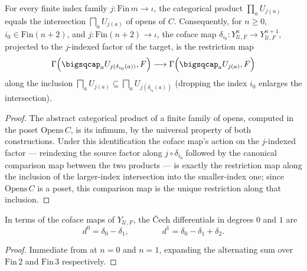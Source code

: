 \begin{lemma}
  \label{lem:adelic_cech_coface_restriction}
  \leanok
  For every finite index family \(j \colon \mathrm{Fin}\, m \to \iota\),
  the categorical product \(\prod_a U_{j(a)}\) equals the intersection
  \(\bigsqcap_a U_{j(a)}\) of opens of \(C\). Consequently, for
  \(n \ge 0\), \(i_0 \in \mathrm{Fin}(n+2)\), and
  \(j \colon \mathrm{Fin}(n+2) \to \iota\), the coface map \(\delta_{i_0}
  \colon Y_{\mathcal{U},F}^n \to Y_{\mathcal{U},F}^{n+1}\), projected to
  the \(j\)-indexed factor of the target, is the restriction map
  \[
    \Gamma\Bigl(\bigsqcap_a U_{j(\delta_{i_0}(a))}, F\Bigr)
      \longrightarrow
    \Gamma\Bigl(\bigsqcap_a U_{j(a)}, F\Bigr)
  \]
  along the inclusion
  \(\bigsqcap_a U_{j(a)} \subseteq \bigsqcap_a U_{j(\delta_{i_0}(a))}\)
  (dropping the index \(i_0\) enlarges the intersection).
\end{lemma}
\begin{proof}
  \leanok
  The abstract categorical product of a finite family of opens, computed
  in the poset \(\mathrm{Opens}\, C\), is its infimum, by the universal
  property of both constructions. Under this identification the coface
  map's action on the \(j\)-indexed factor --- reindexing the source
  factor along \(j \circ \delta_{i_0}\) followed by the canonical
  comparison map between the two products --- is exactly the restriction
  map along the inclusion of the larger-index intersection into the
  smaller-index one; since \(\mathrm{Opens}\, C\) is a poset, this
  comparison map is the unique restriction along that inclusion.
\end{proof}

\begin{lemma}
  \label{lem:adelic_cech_d01_d12_formula}
  \leanok
  In terms of the coface maps of \(Y_{\mathcal{U}, F}\), the Čech
  differentials in degrees \(0\) and \(1\) are
  \[
    d^0 = \delta_0 - \delta_1, \qquad\qquad
    d^1 = \delta_0 - \delta_1 + \delta_2.
  \]
\end{lemma}
\begin{proof}
  \leanok
  Immediate from  at
  \(n = 0\) and \(n = 1\), expanding the alternating sum over
  \(\mathrm{Fin}\, 2\) and \(\mathrm{Fin}\, 3\) respectively.
\end{proof}


